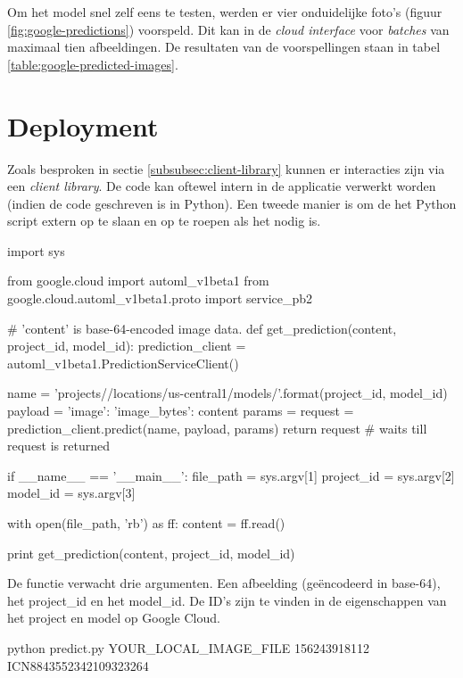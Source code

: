 Om het model snel zelf eens te testen, werden er vier onduidelijke foto's (figuur \ref{fig:google-predictions}) voorspeld. Dit kan in de \textit{cloud interface} voor \textit{batches} van maximaal tien afbeeldingen. De resultaten van de voorspellingen staan in tabel \ref{table:google-predicted-images}.

\section{Deployment}
\label{sec:google-automl-deployment}

Zoals besproken in sectie \ref{subsubsec:client-library} kunnen er interacties zijn via een \textit{client library}. De code kan oftewel intern in de applicatie verwerkt worden (indien de code geschreven is in Python). Een tweede manier is om de het Python script extern op te slaan en op te roepen als het nodig is.

\bigskip

\begin{python}
import sys

from google.cloud import automl_v1beta1
from google.cloud.automl_v1beta1.proto import service_pb2


# 'content' is base-64-encoded image data.
def get_prediction(content, project_id, model_id):
    prediction_client = automl_v1beta1.PredictionServiceClient()
    
    name = 'projects/{}/locations/us-central1/models/{}'.format(project_id, model_id)
    payload = {'image': {'image_bytes': content }}
    params = {}
    request = prediction_client.predict(name, payload, params)
    return request  # waits till request is returned

if __name__ == '__main__':
    file_path = sys.argv[1]
    project_id = sys.argv[2]
    model_id = sys.argv[3]

    with open(file_path, 'rb') as ff:
        content = ff.read()
    
    print get_prediction(content, project_id, model_id)
\end{python}

De functie verwacht drie argumenten. Een afbeelding (geëncodeerd in base-64), het project\_id en het model\_id. De ID's zijn te vinden in de eigenschappen van het project en model op Google Cloud.

\bigskip

\begin{python}
python predict.py YOUR_LOCAL_IMAGE_FILE 156243918112 ICN8843552342109323264
\end{python}


